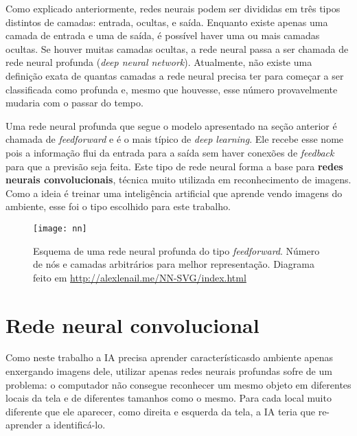 Como explicado anteriormente, redes neurais podem ser divididas em três tipos distintos de camadas: entrada, ocultas, e saída. Enquanto existe apenas uma camada de entrada e uma de saída, é possível haver uma ou mais camadas ocultas. Se houver muitas camadas ocultas, a rede neural passa a ser chamada de rede neural profunda (\textit{deep neural network}). Atualmente, não existe uma definição exata de quantas camadas a rede neural precisa ter para começar a ser classificada como profunda e, mesmo que houvesse, esse número provavelmente mudaria com o passar do tempo.

Uma rede neural profunda que segue o modelo apresentado na seção anterior é chamada de \textit{feedforward} e é o mais típico de \textit{deep learning}. Ele recebe esse nome pois a informação flui da entrada para a saída sem haver conexões de \textit{feedback} para que a previsão seja feita. Este tipo de rede neural forma a base para \textbf{redes neurais convolucionais}, técnica muito utilizada em reconhecimento de imagens. Como a ideia é treinar uma inteligência artificial que aprende vendo imagens do ambiente, esse foi o tipo escolhido para este trabalho.

\begin{figure}[h!]
\texttt{[image: nn]}
\centering
\caption{Esquema de uma rede neural profunda do tipo \textit{feedforward}. Número de nós e camadas arbitrários para melhor representação. Diagrama feito em \url{http://alexlenail.me/NN-SVG/index.html}}
\end{figure}


\section{Rede neural convolucional}
\label{sec:cnn}

Como neste trabalho a IA precisa aprender característicasdo ambiente apenas enxergando imagens dele, utilizar apenas redes neurais profundas sofre de um problema:
o computador não consegue reconhecer um mesmo objeto em diferentes locais da tela e de diferentes tamanhos como o mesmo.
Para cada local muito diferente que ele aparecer, como direita e esquerda da tela, a IA teria que re-aprender a identificá-lo.

